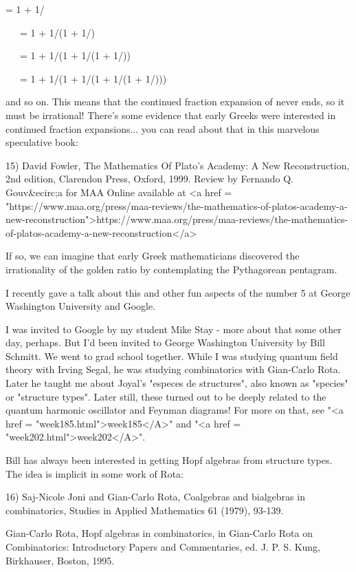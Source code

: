 \Phi  = 1 + 1/\Phi  
   

\ \ \ 
    = 1 + 1/(1 + 1/\Phi )


\ \ \ 
    = 1 + 1/(1 + 1/(1 + 1/\Phi ))


\ \ \ 
    = 1 + 1/(1 + 1/(1 + 1/(1 + 1/\Phi )))

and so on.  This means that the continued fraction expansion of
\Phi  never ends, so it must be irrational!  There's some evidence
that early Greeks were interested in continued fraction expansions...
you can read about that in this marvelous speculative book:

15) David Fowler, The Mathematics Of Plato's Academy:
A New Reconstruction, 2nd edition, Clarendon Press, Oxford, 1999.
Review by Fernando Q. Gouv&ecirc;a for MAA Online available at
<a href = "https://www.maa.org/press/maa-reviews/the-mathematics-of-platos-academy-a-new-reconstruction">https://www.maa.org/press/maa-reviews/the-mathematics-of-platos-academy-a-new-reconstruction</a>

If so, we can imagine that early Greek mathematicians discovered
the irrationality of the golden ratio by contemplating the Pythagorean
pentagram.  

I recently gave a talk about this and other fun aspects of the number
5 at George Washington University and Google.  

I was invited to Google by my student Mike Stay - more about that some
other day, perhaps.  But I'd been invited to George Washington
University by Bill Schmitt.  We went to grad school together.  While I
was studying quantum field theory with Irving Segal, he was studying
combinatorics with Gian-Carlo Rota.  Later he taught me about Joyal's
"especes de structures", also known as "species"
or "structure types".  Later still, these turned out to be
deeply related to the quantum harmonic oscillator and Feynman
diagrams!  For more on that, see "<a href =
"week185.html">week185</A>" and "<a href =
"week202.html">week202</A>".

Bill has always been interested in getting Hopf algebras from structure
types.  The idea is implicit in some work of Rota:

16) Saj-Nicole Joni and Gian-Carlo Rota, Coalgebras and bialgebras in 
combinatorics, Studies in Applied Mathematics 61 (1979), 93-139.

Gian-Carlo Rota, Hopf algebras in combinatorics, in Gian-Carlo
Rota on Combinatorics: Introductory Papers and Commentaries, ed.
J. P. S. Kung, Birkhauser, Boston, 1995.

